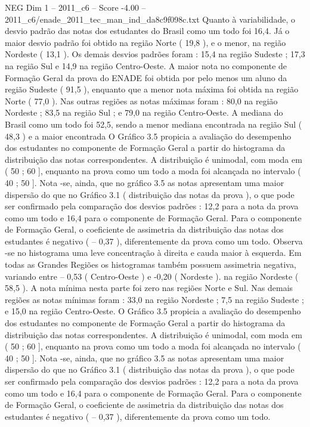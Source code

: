 \begin{textsample}{NEG Dim 1 – 2011\_c6 – Score -4.00 – 2011\_c6/enade\_2011\_tec\_man\_ind\_da8c9f098c.txt}
Quanto à variabilidade, o desvio padrão das notas dos estudantes do Brasil como um todo foi 16,4.
Já o maior desvio padrão foi obtido na região Norte ( 19,8 ), e o menor, na região Nordeste ( 13,1 ).
Os demais desvios padrões foram : 15,4 na região Sudeste ; 17,3 na região Sul e 14,9 na região Centro-Oeste.
A maior nota no componente de Formação Geral da prova do ENADE foi obtida por pelo menos um aluno da região Sudeste ( 91,5 ), enquanto que a menor nota máxima foi obtida na região Norte ( 77,0 ).
Nas outras regiões as notas máximas foram : 80,0 na região Nordeste ; 83,5 na região Sul ; e 79,0 na região Centro-Oeste.
A mediana do Brasil como um todo foi 52,5, sendo a menor mediana encontrada na região Sul ( 48,3 ) e a maior encontrada O Gráfico 3.5 propicia a avaliação do desempenho dos estudantes no componente de Formação Geral a partir do histograma da distribuição das notas correspondentes.
A distribuição é unimodal, com moda em ( 50 ; 60 ], enquanto na prova como um todo a moda foi alcançada no intervalo ( 40 ; 50 ].
Nota -se, ainda, que no gráfico 3.5 as notas apresentam uma maior dispersão do que no Gráfico 3.1 ( distribuição das notas da prova ), o que pode ser confirmado pela comparação dos desvios padrões : 12,2 para a nota da prova como um todo e 16,4 para o componente de Formação Geral.
Para o componente de Formação Geral, o coeficiente de assimetria da distribuição das notas dos estudantes é negativo ( – 0,37 ), diferentemente da prova como um todo.
Observa -se no histograma uma leve concentração à direita e cauda maior à esquerda.
Em todas as Grandes Regiões os histogramas também possuem assimetria negativa, variando entre – 0,53 ( Centro-Oeste ) e -0,20 ( Nordeste ). na região Nordeste ( 58,5 ).
A nota mínima nesta parte foi zero nas regiões Norte e Sul.
Nas demais regiões as notas mínimas foram : 33,0 na região Nordeste ; 7,5 na região Sudeste ; e 15,0 na região Centro-Oeste.
O Gráfico 3.5 propicia a avaliação do desempenho dos estudantes no componente de Formação Geral a partir do histograma da distribuição das notas correspondentes.
A distribuição é unimodal, com moda em ( 50 ; 60 ], enquanto na prova como um todo a moda foi alcançada no intervalo ( 40 ; 50 ].
Nota -se, ainda, que no gráfico 3.5 as notas apresentam uma maior dispersão do que no Gráfico 3.1 ( distribuição das notas da prova ), o que pode ser confirmado pela comparação dos desvios padrões : 12,2 para a nota da prova como um todo e 16,4 para o componente de Formação Geral.
Para o componente de Formação Geral, o coeficiente de assimetria da distribuição das notas dos estudantes é negativo ( – 0,37 ), diferentemente da prova como um todo.

\end{textsample}

